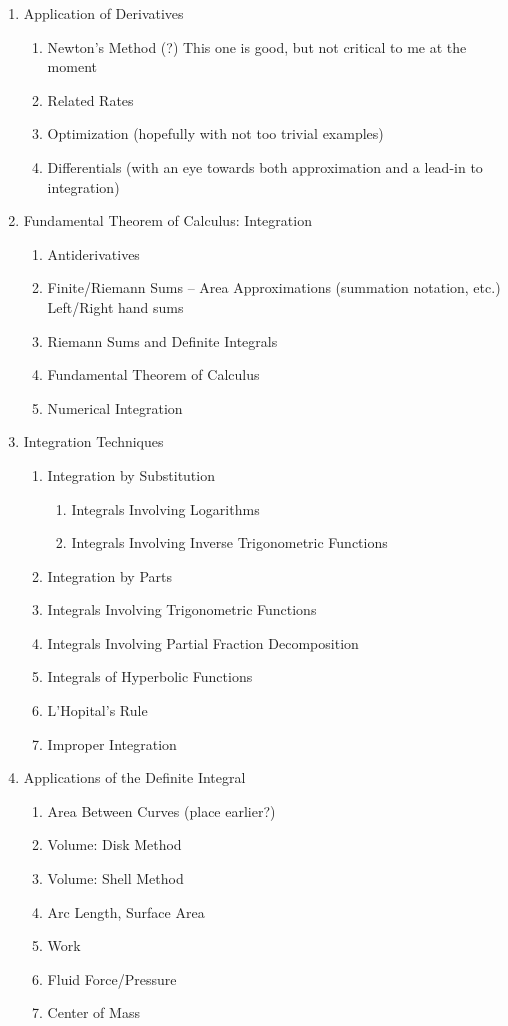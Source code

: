 \documentclass[10pt]{article}
\begin{document}
\begin{enumerate}
\item	Application of Derivatives
		\begin{enumerate}
		\item	Newton's Method (?) This one is good, but not critical to me at the moment
		\item	Related Rates
		\item	Optimization (hopefully with not too trivial examples)
		\item	Differentials (with an eye towards both approximation and a lead-in to integration)
		\end{enumerate}		
		
\item		Fundamental Theorem of Calculus: Integration
		\begin{enumerate}
		\item		Antiderivatives
		\item		Finite/Riemann Sums -- Area Approximations (summation notation, etc.) Left/Right hand sums
		\item		Riemann Sums and Definite Integrals
		\item		Fundamental Theorem of Calculus
		\item		Numerical Integration
		\end{enumerate}

\item		Integration Techniques
		\begin{enumerate}
		\item		Integration by Substitution
			\begin{enumerate}
				\item		Integrals Involving Logarithms
				\item		Integrals Involving Inverse Trigonometric Functions
			\end{enumerate}
		\item		Integration by Parts
		\item		Integrals Involving Trigonometric Functions
		\item		Integrals Involving Partial Fraction Decomposition
		\item		Integrals of Hyperbolic Functions
		\item		L'Hopital's Rule
		\item		Improper Integration
		\end{enumerate}

\item		Applications of the Definite Integral
		\begin{enumerate}
		\item		Area Between Curves (place earlier?)
		\item		Volume: Disk Method
		\item		Volume: Shell Method
		\item		Arc Length, Surface Area
		\item		Work
		\item		Fluid Force/Pressure
		\item		Center of Mass
		\end{enumerate}


\end{enumerate}
\end{document}
